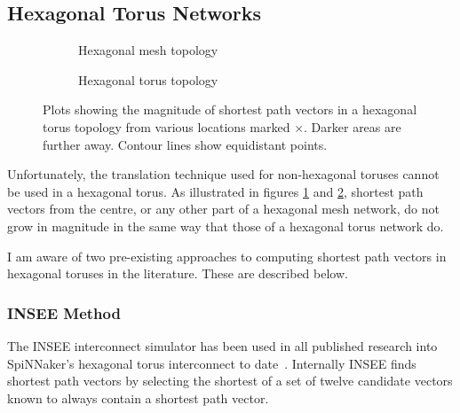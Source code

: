 		\subsection{Hexagonal Torus Networks}
			
			\begin{figure}
				\center
				
				\begin{subfigure}{\linewidth}
					\center
					\caption{Hexagonal mesh topology}
					\label{fig:distance-map-hex-mesh}
				\end{subfigure}
				
				\vspace{1em}
				
				\begin{subfigure}{\linewidth}
					\center
					\caption{Hexagonal torus topology}
					\label{fig:distance-map-hex-torus}
				\end{subfigure}
				
				\caption[Magnitudes of shortest path vectors in a hexagonal torus.]%
				{Plots showing the magnitude of shortest path vectors in a
				hexagonal torus topology from various locations marked
				{\color{red}$\times$}.  Darker areas are further away. Contour lines show
				equidistant points.}
				
				\label{fig:distance-map-hex}
			\end{figure}
			
			Unfortunately, the translation technique used for non-hexagonal toruses
			cannot be used in a hexagonal torus. As illustrated in figures
			\ref{fig:distance-map-hex-mesh} and \ref{fig:distance-map-hex-torus},
			shortest path vectors from the centre, or any other part of a hexagonal
			mesh network, do not grow in magnitude in the same way that those of a
			hexagonal torus network do.
			
			I am aware of two pre-existing approaches to computing shortest path
			vectors in hexagonal toruses in the literature. These are described
			below.
			
			\subsubsection{INSEE Method}
			
				The INSEE interconnect simulator has been used in all published
				research into SpiNNaker's hexagonal torus interconnect to
				date~\cite{navaridas09,ghasempour15}. Internally INSEE finds shortest
				path vectors by selecting the shortest of a set of twelve candidate
				vectors known to always contain a shortest path vector.
				
